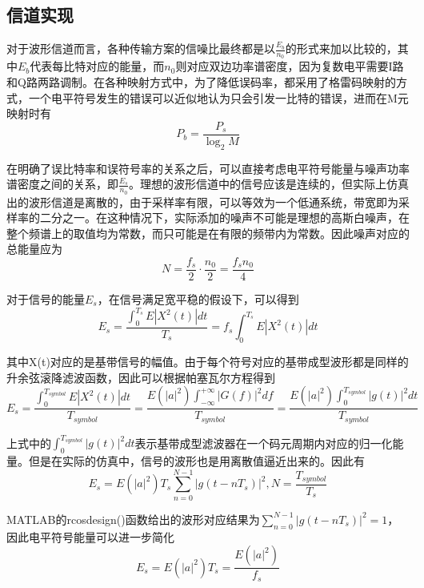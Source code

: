 \subsection{信道实现}

对于波形信道而言，各种传输方案的信噪比最终都是以$\frac{E_b}{n_0}$的形式来加以比较的，其中$E_b$代表每比特对应的能量，而$n_0$则对应双边功率谱密度，因为复数电平需要I路和Q路两路调制。在各种映射方式中，为了降低误码率，都采用了格雷码映射的方式，一个电平符号发生的错误可以近似地认为只会引发一比特的错误，进而在M元映射时有
\begin{equation*}
P_b=\frac{P_s}{\log_2M}
\end{equation*}

在明确了误比特率和误符号率的关系之后，可以直接考虑电平符号能量与噪声功率谱密度之间的关系，即$\frac{E_s}{n_0}$。理想的波形信道中的信号应该是连续的，但实际上仿真出的波形信道是离散的，由于采样率有限，可以等效为一个低通系统，带宽即为采样率的二分之一。在这种情况下，实际添加的噪声不可能是理想的高斯白噪声，在整个频谱上的取值均为常数，而只可能是在有限的频带内为常数。因此噪声对应的总能量应为
\begin{equation*}
N=\frac{f_s}{2}\cdot\frac{n_0}{2}=\frac{f_sn_0}{4}
\end{equation*}

对于信号的能量$E_s$，在信号满足宽平稳的假设下，可以得到
\begin{equation*}
E_s=\frac{\int_{0}^{T_s}E|X^2(t)|dt}{T_s}=f_s\int_{0}^{T_s}E|X^2(t)|dt
\end{equation*}

其中X(t)对应的是基带信号的幅值。由于每个符号对应的基带成型波形都是同样的升余弦滚降滤波函数，因此可以根据帕塞瓦尔方程得到
\begin{equation*}
E_s=\frac{\int_{0}^{T_{symbol}}E|X^2(t)|dt}{T_{symbol}}=\frac{E(|a|^2)\int_{-\infty}^{+\infty}|G(f)|^2df}{T_{symbol}}=\frac{E(|a|^2)\int_{0}^{T_{symbol}}|g(t)|^2dt}{T_{symbol}}
\end{equation*}

上式中的$\int_{0}^{T_{symbol}}|g(t)|^2dt$表示基带成型滤波器在一个码元周期内对应的归一化能量。但是在实际的仿真中，信号的波形也是用离散值逼近出来的。因此有
\begin{equation*}
E_s=E(|a|^2)T_s\sum\limits_{n=0}^{N-1}|g(t-nT_s)|^2, N=\frac{T_{symbol}}{T_s}
\end{equation*}

MATLAB的rcosdesign()函数给出的波形对应结果为$\sum\limits_{n=0}^{N-1}|g(t-nT_s)|^2=1$，因此电平符号能量可以进一步简化
\begin{equation*}
E_s=E(|a|^2)T_s=\frac{E(|a|^2)}{f_s}
\end{equation*}

